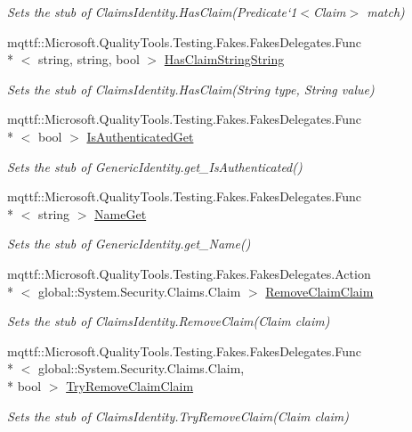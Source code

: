 \begin{DoxyCompactItemize}
\begin{DoxyCompactList}\small\item\em Sets the stub of Claims\-Identity.\-Has\-Claim(Predicate`1$<$Claim$>$ match)\end{DoxyCompactList}\item 
mqttf\-::\-Microsoft.\-Quality\-Tools.\-Testing.\-Fakes.\-Fakes\-Delegates.\-Func\\*
$<$ string, string, bool $>$ \hyperlink{class_system_1_1_security_1_1_principal_1_1_fakes_1_1_stub_generic_identity_a9a64f2e2383c238e6fccc569fc0c1db0}{Has\-Claim\-String\-String}
\begin{DoxyCompactList}\small\item\em Sets the stub of Claims\-Identity.\-Has\-Claim(\-String type, String value)\end{DoxyCompactList}\item 
mqttf\-::\-Microsoft.\-Quality\-Tools.\-Testing.\-Fakes.\-Fakes\-Delegates.\-Func\\*
$<$ bool $>$ \hyperlink{class_system_1_1_security_1_1_principal_1_1_fakes_1_1_stub_generic_identity_af53e2e026aa95fb7a57101cb1c013c7a}{Is\-Authenticated\-Get}
\begin{DoxyCompactList}\small\item\em Sets the stub of Generic\-Identity.\-get\-\_\-\-Is\-Authenticated()\end{DoxyCompactList}\item 
mqttf\-::\-Microsoft.\-Quality\-Tools.\-Testing.\-Fakes.\-Fakes\-Delegates.\-Func\\*
$<$ string $>$ \hyperlink{class_system_1_1_security_1_1_principal_1_1_fakes_1_1_stub_generic_identity_a2a2891d6441b224bc324c62d9fe72c1f}{Name\-Get}
\begin{DoxyCompactList}\small\item\em Sets the stub of Generic\-Identity.\-get\-\_\-\-Name()\end{DoxyCompactList}\item 
mqttf\-::\-Microsoft.\-Quality\-Tools.\-Testing.\-Fakes.\-Fakes\-Delegates.\-Action\\*
$<$ global\-::\-System.\-Security.\-Claims.\-Claim $>$ \hyperlink{class_system_1_1_security_1_1_principal_1_1_fakes_1_1_stub_generic_identity_a3f5f4a5f9eb661bc3484e97a9a20c044}{Remove\-Claim\-Claim}
\begin{DoxyCompactList}\small\item\em Sets the stub of Claims\-Identity.\-Remove\-Claim(\-Claim claim)\end{DoxyCompactList}\item 
mqttf\-::\-Microsoft.\-Quality\-Tools.\-Testing.\-Fakes.\-Fakes\-Delegates.\-Func\\*
$<$ global\-::\-System.\-Security.\-Claims.\-Claim, \\*
bool $>$ \hyperlink{class_system_1_1_security_1_1_principal_1_1_fakes_1_1_stub_generic_identity_a2a12d65a713a3db0d8f81b8617aee32a}{Try\-Remove\-Claim\-Claim}
\begin{DoxyCompactList}\small\item\em Sets the stub of Claims\-Identity.\-Try\-Remove\-Claim(\-Claim claim)\end{DoxyCompactList}\end{DoxyCompactItemize}
